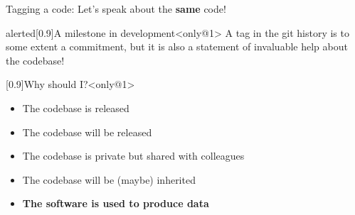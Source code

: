 \documentclass[usenames,svgnames,14pt]{beamer}
\begin{document}
\begin{frame}[fragile]{Tagging a code: Let's speak about the \textbf{same} code!}
    \vspace{-3mm}
    \begin{varblock}{alerted}[0.9\textwidth]{A milestone in development}<only@1>
        A tag in the git history is to some extent a commitment, but it is also a statement of invaluable help about the codebase!
    \end{varblock}
    \begin{varblock}{}[0.9\textwidth]{Why should I?}<only@1>
        \begin{itemize}
            \item The codebase is released
            \item The codebase will be released
            \item The codebase is  private but shared with colleagues
            \item The codebase will be (maybe) inherited
            \item \textbf{The software is used to produce data}
        \end{itemize}
    \end{varblock}
\end{frame}


\end{document}
